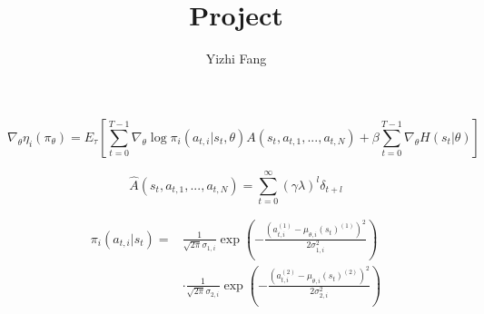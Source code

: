 \documentclass[12pt, letter]{article}
\title{Project}
\author{Yizhi Fang}
\date{}
\begin{document}
\maketitle

\begin{equation}
\nabla_{\theta}\eta_i(\pi_{\theta}) = E_{\tau}[\sum^{T-1}_{t=0}\nabla_{\theta}\log\pi_i(a_{t, i}|s_t, \theta)A(s_t, a_{t, 1}, ..., a_{t, N}) + \beta\sum^{T-1}_{t=0}\nabla_{\theta}H(s_t|\theta)]
\label{grad}
\end{equation}

\begin{equation}
\hat{A}(s_t, a_{t, 1}, ..., a_{t, N}) = \sum^{\infty}_{t=0} (\gamma \lambda)^l \delta_{t+l}
\label{advantage1}
\end{equation}

\begin{align*}
\pi_i(a_{t, i}|s_t) = & \frac{1}{\sqrt{2\pi} \sigma_{1, i}} \exp( -\frac{(a_{t, i}^{(1)}-\mu_{\theta, i}(s_t)^{(1)})^2}{2\sigma_{1, i}^2}) \\
& \cdot \frac{1}{\sqrt{2\pi} \sigma_{2, i}} \exp( -\frac{(a_{t, i}^{(2)}-\mu_{\theta, i}(s_t)^{(2)})^2}{2\sigma_{2, i}^2}) \\
\end{align*}
\end{document}
